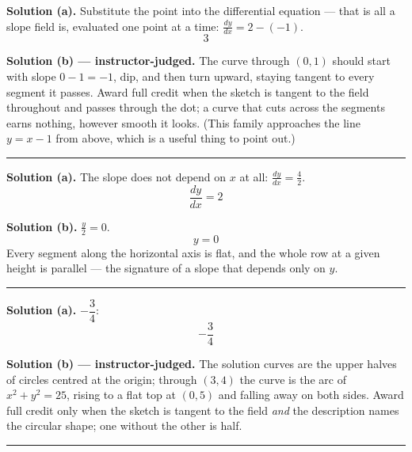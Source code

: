 \documentclass[12pt]{article}
\begin{document}



\textbf{Solution (a).} Substitute the point into the differential equation ---
that is all a slope field is, evaluated one point at a time:
$\frac{dy}{dx} = 2 - (-1)$.
\[ \boxed{3} \]

\textbf{Solution (b) --- instructor-judged.} The curve through $(0,1)$ should
start with slope $0 - 1 = -1$, dip, and then turn upward, staying tangent to
every segment it passes. Award full credit when the sketch is tangent to the
field throughout and passes through the dot; a curve that cuts across the
segments earns nothing, however smooth it looks. (This family approaches the
line $y = x - 1$ from above, which is a useful thing to point out.)

\vspace{0.15cm}\noindent\rule{\linewidth}{0.2pt}


\textbf{Solution (a).} The slope does not depend on $x$ at all:
$\frac{dy}{dx} = \frac{4}{2}$.
\[ \boxed{\frac{dy}{dx} = 2} \]

\textbf{Solution (b).} $\frac{y}{2} = 0$.
\[ \boxed{y = 0} \]
Every segment along the horizontal axis is flat, and the whole row at a given
height is parallel --- the signature of a slope that depends only on $y$.

\vspace{0.15cm}\noindent\rule{\linewidth}{0.2pt}


\textbf{Solution (a).} $-\dfrac{3}{4}$:
\[ \boxed{-\frac{3}{4}} \]

\textbf{Solution (b) --- instructor-judged.} The solution curves are the upper
halves of circles centred at the origin; through $(3,4)$ the curve is the arc of
$x^2 + y^2 = 25$, rising to a flat top at $(0,5)$ and falling away on both
sides. Award full credit only when the sketch is tangent to the field
\emph{and} the description names the circular shape; one without the other is
half.

\vspace{0.15cm}\noindent\rule{\linewidth}{0.2pt}
\end{document}
